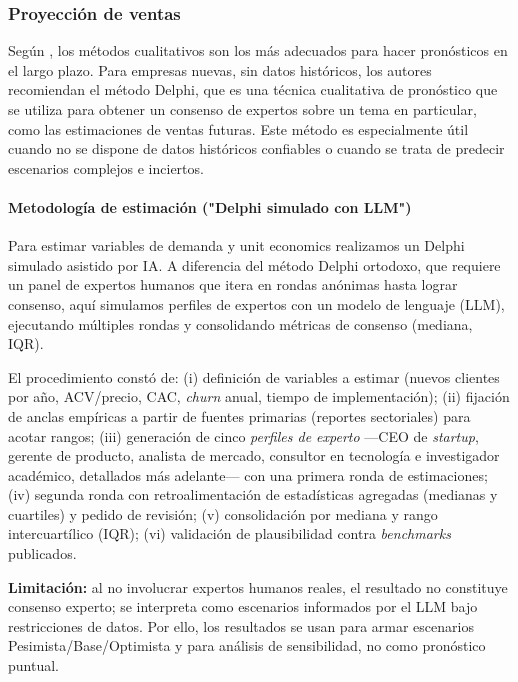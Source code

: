 \subsubsection{Proyección de ventas}

Según \textcite{mentzer2005sales}, los métodos cualitativos son los más adecuados para hacer pronósticos en el largo plazo. Para empresas nuevas, sin datos históricos, los autores recomiendan el método Delphi, que es una técnica cualitativa de pronóstico que se utiliza para obtener un consenso de expertos sobre un tema en particular, como las estimaciones de ventas futuras. Este método es especialmente útil cuando no se dispone de datos históricos confiables o cuando se trata de predecir escenarios complejos e inciertos.

\paragraph{Metodología de estimación ("Delphi simulado con LLM")}

Para estimar variables de demanda y unit economics realizamos un Delphi simulado asistido por IA. A diferencia del método Delphi ortodoxo, que requiere un panel de expertos humanos que itera en rondas anónimas hasta lograr consenso, aquí simulamos perfiles de expertos con un modelo de lenguaje (LLM), ejecutando múltiples rondas y consolidando métricas de consenso (mediana, IQR).

El procedimiento constó de: (i) definición de variables a estimar (nuevos clientes por año, ACV/precio, CAC, \textit{churn} anual, tiempo de implementación); (ii) fijación de anclas empíricas a partir de fuentes primarias (reportes sectoriales) para acotar rangos; (iii) generación de cinco \emph{perfiles de experto} —CEO de \textit{startup}, gerente de producto, analista de mercado, consultor en tecnología e investigador académico, detallados más adelante— con una primera ronda de estimaciones; (iv) segunda ronda con retroalimentación de estadísticas agregadas (medianas y cuartiles) y pedido de revisión; (v) consolidación por mediana y rango intercuartílico (IQR); (vi) validación de plausibilidad contra \textit{benchmarks} publicados.

\textbf{Limitación:} al no involucrar expertos humanos reales, el resultado no constituye consenso experto; se interpreta como escenarios informados por el LLM bajo restricciones de datos. Por ello, los resultados se usan para armar escenarios Pesimista/Base/Optimista y para análisis de sensibilidad, no como pronóstico puntual.

